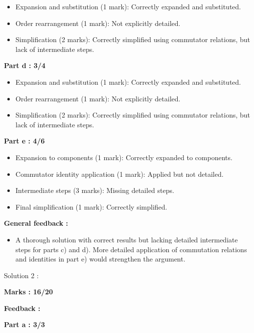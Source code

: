 \documentclass[a4paper,11pt]{article}
\begin{document}
\begin{itemize}
    \item Expansion and substitution (1 mark): Correctly expanded and substituted.
    \item Order rearrangement (1 mark): Not explicitly detailed.
    \item Simplification (2 marks): Correctly simplified using commutator relations, but lack of intermediate steps.
\end{itemize}


\textbf{Part d : 3/4}

\begin{itemize}
    \item Expansion and substitution (1 mark): Correctly expanded and substituted.
    \item Order rearrangement (1 mark): Not explicitly detailed.
    \item Simplification (2 marks): Correctly simplified using commutator relations, but lack of intermediate steps.
\end{itemize}



\textbf{Part e : 4/6}

\begin{itemize}
    \item Expansion to components (1 mark): Correctly expanded to components.
    \item Commutator identity application (1 mark): Applied but not detailed.
    \item Intermediate steps (3 marks): Missing detailed steps.
    \item Final simplification (1 mark): Correctly simplified.
\end{itemize}


\textbf{General feedback :}

\begin{itemize}
    \item A thorough solution with correct results but lacking detailed intermediate steps for parts c) and d). More detailed application of commutation relations and identities in part e) would strengthen the argument.
\end{itemize}



Solution 2 :

\textbf{Marks : 16/20}

\textbf{Feedback :}

\textbf{Part a : 3/3}
\end{document}
